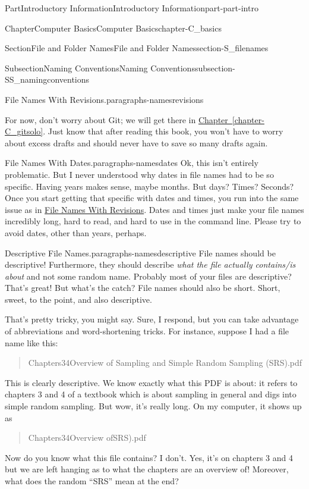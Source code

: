 \documentclass[oneside,10pt,]{book}
\newcommand{\xreffont}{\relax}
\begin{document}
\begin{partptx}{Part}{Introductory Information}{}{Introductory Information}{}{}{part-part-intro}
\begin{chapterptx}{Chapter}{Computer Basics}{}{Computer Basics}{}{}{chapter-C_basics}
\begin{sectionptx}{Section}{File and Folder Names}{}{File and Folder Names}{}{}{section-S_filenames}
\begin{subsectionptx}{Subsection}{Naming Conventions}{}{Naming Conventions}{}{}{subsection-SS_namingconventions}
\begin{paragraphs}{File Names With Revisions.}{paragraphs-namesrevisions}
\par
For now, don't worry about Git; we will get there in \hyperref[chapter-C_gitsolo]{Chapter~{\xreffont\ref{chapter-C_gitsolo}}}. Just know that after reading this book, you won't have to worry about excess drafts and should never have to save so many drafts again.%
\end{paragraphs}%
\begin{paragraphs}{File Names With Dates.}{paragraphs-namesdates}%
%
Ok, this isn't entirely problematic. But I never understood why dates in file names had to be so specific. Having years makes sense, maybe months. But days? Times? Seconds? Once you start getting that specific with dates and times, you run into the same issue as in \hyperlink{paragraphs-namesrevisions}{File Names With Revisions}. Dates and times just make your file names incredibly long, hard to read, and hard to use in the command line. Please try to avoid dates, other than years, perhaps.%
\end{paragraphs}%
\begin{paragraphs}{Descriptive File Names.}{paragraphs-namesdescriptive}%
%
%
File names should be descriptive! Furthermore, they should describe \emph{what the file actually contains\slash{}is about} and not some random name. Probably most of your files are descriptive? That's great! But what's the catch? File names should also be short. Short, sweet, to the point, and also descriptive.%
\par
That's pretty tricky, you might say. Sure, I respond, but you can take advantage of abbreviations and word-shortening tricks. For instance, suppose I had a file name like this:%
\begin{quote}%
Chapters3\textunderscore{}4\textunderscore{}Overview of Sampling and Simple Random Sampling (SRS).pdf%
\end{quote}
This is clearly descriptive. We know exactly what this PDF is about: it refers to chapters 3 and 4 of a textbook which is about sampling in general and digs into simple random sampling. But wow, it's really long. On my computer, it shows up as%
\begin{quote}%
Chapters3\textunderscore{}4\textunderscore{}Overview of\textellipsis{}SRS).pdf%
\end{quote}
Now do you know what this file contains? I don't. Yes, it's on chapters 3 and 4 but we are left hanging as to what the chapters are an overview of! Moreover, what does the random ``SRS'' mean at the end?%

\end{paragraphs}
\end{subsectionptx}
\end{sectionptx}
\end{chapterptx}
\end{partptx}
\end{document}
